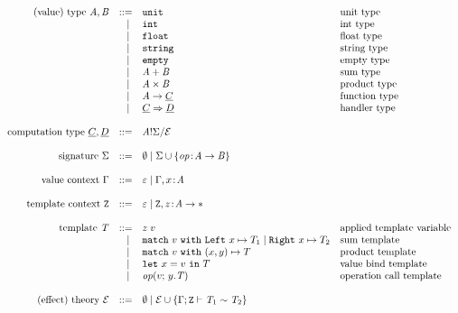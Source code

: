 
\[
	\begin{array}{rrll}
		\text{(value) type}~\tyA, \tyB
		 & ::=   & \unittype          				& \text{unit type}\\
		 & \vsep & \inttype         					& \text{int type}\\
		 & \vsep & \floattype         				& \text{float type}\\
		 & \vsep & \stringtype         				& \text{string type}\\
		 & \vsep & \emptytype         				& \text{empty type}\\
		 & \vsep & \sumtype{\tyA}{\tyB}   		& \text{sum type}\\
		 & \vsep & \producttype{\tyA}{\tyB}   & \text{product type}\\
		 & \vsep & \tyA \to \ctyC     				& \text{function type}\\
		 & \vsep & \ctyC \hto \ctyD   				& \text{handler type}\\
		\\
		\text{computation type}~\ctyC, \ctyD
		 & ::=   & \ctype{\tyA}{\sig}{\eqE}\\
		\\
		\text{signature}~\sig
		 & ::=   & \nil \vsep \sig \union \set{{\op \oftype \tyA \to \tyB}}\\
		\\
		\text{value context}~\ctx
		 & ::=   & \varepsilon \vsep \ctx, x \oftype \tyA \\
		\\
		\text{template context}~\tvars
		 & ::=   & \varepsilon \vsep \tvars, z \oftype \tyA \to \anytype \\
		\\
		\text{template}~\tmplT
		 & ::=   & \apply{z}{v} & \text{applied template variable} \\
		 & \vsep & \match{v} \inleft{x} \mapsto T_1 \vsep \inright{x} \mapsto T_2  & \text{sum template} \\
		 & \vsep & \match{v} \pair{x}{y} \mapsto T & \text{product template} \\
		 & \vsep & \letbind{x}{v} T & \text{value bind template} \\
		 & \vsep & \operation{v}{y.\tmplT} & \text{operation call template} \\
		\\
		\text{(effect) theory}~\eqE
		 & ::=   & \nil \vsep \eqE \union
		\set{\teqjudgement{\tenv}{\tmplT_1 \rel \tmplT_2}}\\
	\end{array}
\]
